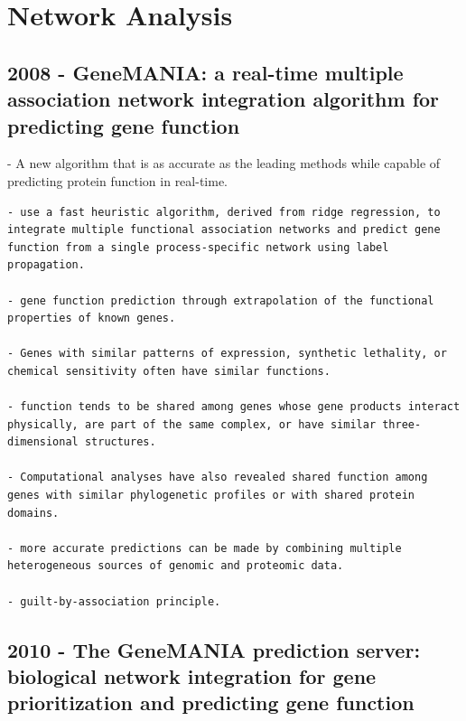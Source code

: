 \documentclass[
]{book}
\begin{document}
\hypertarget{network-analysis-1}{%
\section{Network Analysis}\label{network-analysis-1}}

\hypertarget{genemania-a-real-time-multiple-association-network-integration-algorithm-for-predicting-gene-function}{%
\subsection{2008 - GeneMANIA: a real-time multiple association network integration algorithm for predicting gene function}\label{genemania-a-real-time-multiple-association-network-integration-algorithm-for-predicting-gene-function}}

- A new algorithm that is as accurate as the leading methods while capable of predicting protein function in real-time.

\begin{verbatim}
- use a fast heuristic algorithm, derived from ridge regression, to integrate multiple functional association networks and predict gene function from a single process-specific network using label propagation.

- gene function prediction through extrapolation of the functional properties of known genes.

- Genes with similar patterns of expression, synthetic lethality, or chemical sensitivity often have similar functions.

- function tends to be shared among genes whose gene products interact physically, are part of the same complex, or have similar three-dimensional structures.

- Computational analyses have also revealed shared function among genes with similar phylogenetic profiles or with shared protein domains.

- more accurate predictions can be made by combining multiple heterogeneous sources of genomic and proteomic data.

- guilt-by-association principle.
\end{verbatim}

\hypertarget{the-genemania-prediction-server-biological-network-integration-for-gene-prioritization-and-predicting-gene-function}{%
\subsection{2010 - The GeneMANIA prediction server: biological network integration for gene prioritization and predicting gene function}\label{the-genemania-prediction-server-biological-network-integration-for-gene-prioritization-and-predicting-gene-function}}
\end{document}
